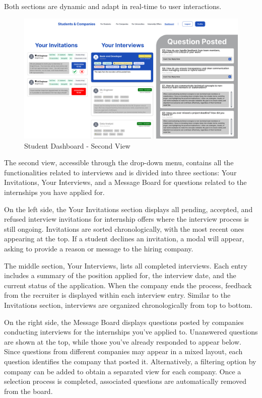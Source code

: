 Both sections are dynamic and adapt in real-time to user interactions.

\begin{figure} [H]
    \begin{center}
        \includegraphics[width=0.9\linewidth]{LaTeXCode/images/UI/Student Dashboard - Second View.png}
        \caption{Student Dashboard - Second View}
        \label{fig: dashboard_student_second}
    \end{center}
\end{figure}

The second view, accessible through the drop-down menu, contains all the functionalities related to interviews and is divided into three sections: Your Invitations, Your Interviews, and a Message Board for questions related to the internships you have applied for.

On the left side, the Your Invitations section displays all pending, accepted, and refused interview invitations for internship offers where the interview process is still ongoing. Invitations are sorted chronologically, with the most recent ones appearing at the top. If a student declines an invitation, a modal will appear, asking to provide a reason or message to the hiring company.

The middle section, Your Interviews, lists all completed interviews. Each entry includes a summary of the position applied for, the interview date, and the current status of the application. 
When the company ends the process, feedback from the recruiter is displayed within each interview entry. Similar to the Invitations section, interviews are organized chronologically from top to bottom.

On the right side, the Message Board displays questions posted by companies conducting interviews for the internships you’ve applied to. Unanswered questions are shown at the top, while those you’ve already responded to appear below. Since questions from different companies may appear in a mixed layout, each question identifies the company that posted it. Alternatively, a filtering option by company can be added to obtain a separated view for each company. Once a selection process is completed, associated questions are automatically removed from the board.

